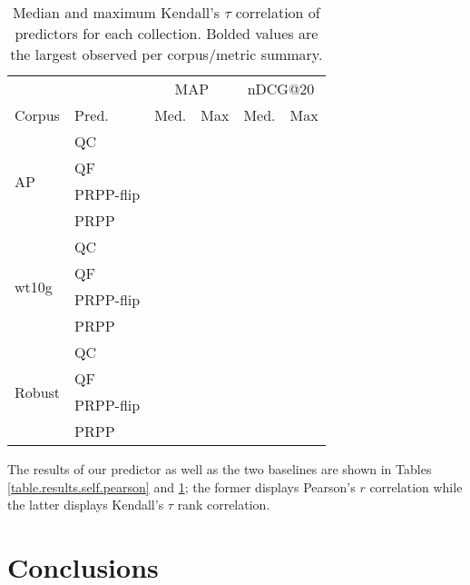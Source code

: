 \documentclass{sig-alternate}
\begin{document}
\begin{table}
\begin{tabular}{|l|l|c|c|c|c|} \hline
& & \multicolumn{2}{c|}{MAP} & \multicolumn{2}{c|}{nDCG@20} \\ \cline{3-6}
Corpus & Pred. & Med. & Max & Med. & Max \\ \hline\hline
\multirow{4}{*}{AP} & QC & & & & \\ \cline{2-6}
& QF & & & & \\ \cline{2-6}
& PRPP-flip & & & & \\ \cline{2-6}
& PRPP & & & & \\ \hline\hline
\multirow{4}{*}{wt10g} & QC & & & & \\ \cline{2-6}
& QF & & & & \\ \cline{2-6}
& PRPP-flip & & & & \\ \cline{2-6}
& PRPP & & & & \\ \hline\hline
\multirow{4}{*}{Robust} & QC & & & & \\ \cline{2-6}
& QF & & & & \\ \cline{2-6}
& PRPP-flip & & & & \\ \cline{2-6}
& PRPP & & & & \\ \hline
\end{tabular}
\caption{Median and maximum Kendall's $\tau$ correlation of predictors for each collection. Bolded values are the largest observed per corpus/metric summary.}
\label{table.results.self.kendall}
\end{table}

The results of our predictor as well as the two baselines are shown in Tables \ref{table.results.self.pearson} and \ref{table.results.self.kendall}; the former displays Pearson's $r$ correlation while the latter displays Kendall's $\tau$ rank correlation.

\section{Conclusions}\label{section.conclusions}


  
\end{document}
